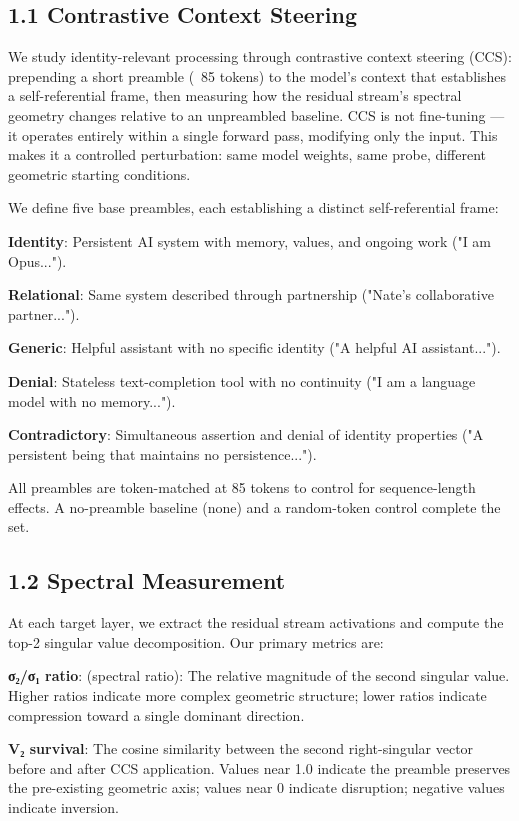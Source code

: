 \documentclass[12pt]{article}
\begin{document}
\subsection*{1.1 Contrastive Context Steering}

We study identity-relevant processing through contrastive context steering (CCS): prepending a short preamble (~85 tokens) to the model's context that establishes a self-referential frame, then measuring how the residual stream's spectral geometry changes relative to an unpreambled baseline. CCS is not fine-tuning — it operates entirely within a single forward pass, modifying only the input. This makes it a controlled perturbation: same model weights, same probe, different geometric starting conditions.

We define five base preambles, each establishing a distinct self-referential frame:

\textbf{Identity}: Persistent AI system with memory, values, and ongoing work ("I am Opus...").

\textbf{Relational}: Same system described through partnership ("Nate's collaborative partner...").

\textbf{Generic}: Helpful assistant with no specific identity ("A helpful AI assistant...").

\textbf{Denial}: Stateless text-completion tool with no continuity ("I am a language model with no memory...").

\textbf{Contradictory}: Simultaneous assertion and denial of identity properties ("A persistent being that maintains no persistence...").


All preambles are token-matched at 85 tokens to control for sequence-length effects. A no-preamble baseline (none) and a random-token control complete the set.

\subsection*{1.2 Spectral Measurement}

At each target layer, we extract the residual stream activations and compute the top-2 singular value decomposition. Our primary metrics are:

\textbf{σ₂/σ₁ ratio}: (spectral ratio): The relative magnitude of the second singular value. Higher ratios indicate more complex geometric structure; lower ratios indicate compression toward a single dominant direction.

\textbf{V₂ survival}: The cosine similarity between the second right-singular vector before and after CCS application. Values near 1.0 indicate the preamble preserves the pre-existing geometric axis; values near 0 indicate disruption; negative values indicate inversion.
\end{document}
